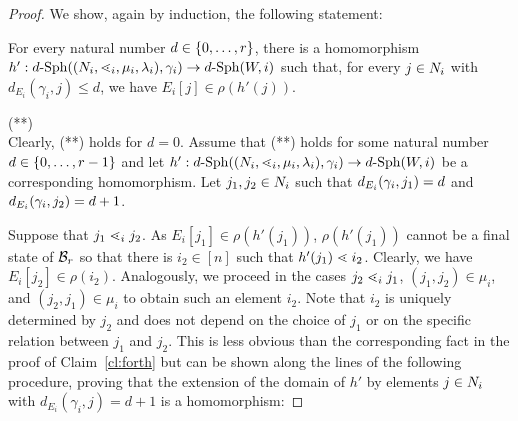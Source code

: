 \documentclass{LMCS}
\begin{document}
\begin{proof}
  We show, again by induction, the following statement:
  \vspace{1.5ex}\\
  \hspace*{\fill}
   \begin{minipage}{.8\linewidth}
     For every natural number $d \in \{0,\ldots,r\}$, there is a
     homomorphism $h': d\text{-}\mathrm{Sph}((N_i,\mathord{\lessdot}_i,\mu_i,\lambda_i),\gamma_i)
     \rightarrow d\text{-}\mathrm{Sph}(W,i)$ such that, for every $j \in N_i$ with
     $d_{E_i}(\gamma_i,j) \le d$, we have $E_i[j] \in \rho(h'(j))$.
   \end{minipage}
   \hspace{\fill}(**) \vspace{1.5ex}\\ Clearly, (**) holds for $d=0$. Assume
   that (**) holds for some natural number $d \in \{0,\ldots,r-1\}$ and
   let $h': d\text{-}\mathrm{Sph}((N_i,\mathord{\lessdot}_i,\mu_i,\lambda_i),\gamma_i) \rightarrow
   d\text{-}\mathrm{Sph}(W,i)$ be a corresponding homomorphism. Let $j_1,j_2 \in N_i$
   such that $d_{E_i}(\gamma_i,j_1) = d$ and $d_{E_i}(\gamma_i,j_2) =
   d+1$.

   Suppose that $j_1 \mathrel{\lessdot}_i j_2$. As $E_i[j_1] \in \rho(h'(j_1))$,
   $\rho(h'(j_1))$ cannot be a final state of $\mathcal{B}_r$ so that there is
   $i_2 \in [n]$ such that $h'(j_1) \mathrel{\lessdot} i_2$. Clearly, we have $E_i[j_2]
   \in \rho(i_2)$. Analogously, we proceed in the cases $j_2 \mathrel{\lessdot}_i j_1$,
   $(j_1,j_2) \in \mu_i$, and $(j_2,j_1) \in \mu_i$ to obtain such an element
   $i_2$. Note that $i_2$ is uniquely determined by $j_2$ and does not depend
   on the choice of $j_1$ or on the specific relation between $j_1$ and $j_2$.
   This is less obvious than the corresponding fact in the proof of
   Claim~\ref{cl:forth} but can be shown along the lines of the following
   procedure, proving that the extension of the domain of $h'$ by elements $j
   \in N_i$ with $d_{E_i}(\gamma_i,j) = d+1$ is a homomorphism:




\end{proof}
\end{document}
